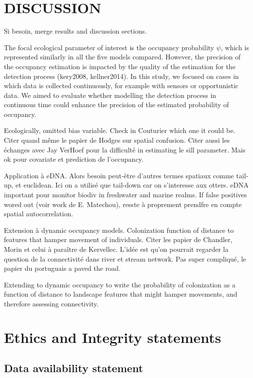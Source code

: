 \documentclass[
  11pt,
  a4paper,
]{article}
\begin{document}
\section{DISCUSSION}\label{discussion}

Si besoin, merge results and discussion sections.

The focal ecological parameter of interest is the occupancy probability \(\psi\), which is represented similarly in all the five models compared. However, the precision of the occupancy estimation is impacted by the quality of the estimation for the detection process (kery2008, kellner2014). In this study, we focused on cases in which data is collected continuously, for example with sensors or opportunistic data. We aimed to evaluate whether modelling the detection process in continuous time could enhance the precision of the estimated probability of occupancy.

Ecologically, omitted bias variable. Check in Couturier which one it could be. Citer quand même le papier de Hodges sur spatial confusion. Citer aussi les échanges avec Jay VerHoef pour la difficulté in estimating le sill parameter. Mais ok pour covariate et prediction de l'occupancy.

Application à eDNA. Alors besoin peut-être d'autres termes spatiaux comme tail-up, et euclidean. Ici on a utilisé que tail-down car on s'interesse aux otters. eDNA important pour monitor biodiv in freshwater and marine realms. If false positives wored out (voir work de E. Matechou), resste à proprement prendfre en compte spatial autocorrelation.

Extension à dynamic occupancy models. Colonization function of distance to features that hamper movement of individuals. Citer les papier de Chandler, Morin et celui à paraître de Kervellec. L'idée est qu'on pourrait regarder la question de la connectivité dans river et stream network. Pas super compliqué, le papier du portuguais a paved the road.

Extending to dynamic occupancy to write the probability of colonization as a function of distance to landscape features that might hamper movements, and therefore assessing connectivity.

\section{Ethics and Integrity statements}\label{ethics-and-integrity-statements}

\subsection{Data availability statement}\label{data-availability-statement}
\end{document}
